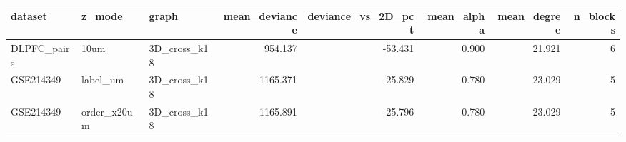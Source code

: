 \begin{tabular}{lllrrrrr}
\toprule
dataset & z_mode & graph & mean_deviance & deviance_vs_2D_pct & mean_alpha & mean_degree & n_blocks \\
\midrule
DLPFC_pairs & 10um & 3D_cross_k18 & 954.137 & -53.431 & 0.900 & 21.921 & 6 \\
GSE214349 & label_um & 3D_cross_k18 & 1165.371 & -25.829 & 0.780 & 23.029 & 5 \\
GSE214349 & order_x20um & 3D_cross_k18 & 1165.891 & -25.796 & 0.780 & 23.029 & 5 \\
\bottomrule
\end{tabular}
